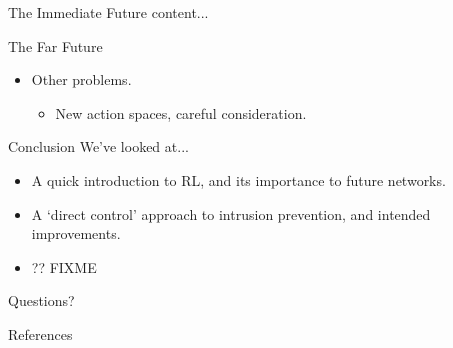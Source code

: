 \documentclass[aspectratio=169,xcolor={dvipsnames}
,hide notes
]{beamer}
\begin{document}
\begin{frame}{The Immediate Future}
content...
\end{frame}

\begin{frame}{The Far Future}
\begin{itemize}
	\item Other problems.
	\begin{itemize}
		\item New action spaces, careful consideration.
	\end{itemize}
\end{itemize}
\end{frame}

\begin{frame}[standout]{Conclusion}
	We've looked at...
	\begin{itemize}
		\item A quick introduction to RL, and its \alert{importance to future networks}.
		\item A `direct control' approach to intrusion prevention, and \alert{intended improvements}.
		\item ?? FIXME
	\end{itemize}
	
	\alert{Questions?}
\end{frame}

\appendix

\begin{frame}[allowframebreaks]{References}
\printbibliography[heading=none]
\end{frame}
\end{document}
